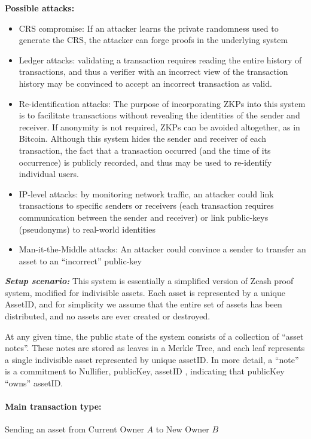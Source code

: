 		
\textbf{Possible attacks:}
\begin{itemize}
 \item CRS compromise: If an attacker learns the private randomness used to generate the CRS, the attacker can forge proofs in the underlying system
 \item Ledger attacks: validating a transaction requires reading the entire history of transactions, and thus a verifier with an incorrect view of the transaction history may be convinced to accept an incorrect transaction as valid.
 \item Re-identification attacks: The purpose of incorporating ZKPs into this system is to facilitate transactions without revealing the identities of the sender and receiver.  If anonymity is not required, ZKPs can be avoided altogether, as in Bitcoin.  Although this system hides the sender and receiver of each transaction, the fact that a transaction occurred (and the time of its occurrence) is publicly recorded, and thus may be used to re-identify individual users.
 \item IP-level attacks: by monitoring network traffic, an attacker could link transactions to specific senders or receivers (each transaction requires communication between the sender and receiver) or link public-keys (pseudonyms) to real-world identities
 \item Man-it-the-Middle attacks: An attacker could convince a sender to transfer an asset to an “incorrect” public-key
\end{itemize}


\emph{\textbf{Setup scenario:}}  This system is essentially a simplified version of Zcash proof system, modified for indivisible assets.  Each asset is represented by a unique AssetID, and for simplicity we assume that the entire set of assets has been distributed, and no assets are ever created or destroyed.

At any given time, the public state of the system consists of a collection of “asset notes”.  These notes are stored as leaves in a Merkle Tree, and each leaf represents a single indivisible asset represented by unique assetID.  In more detail, a “note” is a commitment to { Nullifier, publicKey, assetID }, indicating that publicKey “owns” assetID.


\paragraph{Main transaction type:} 
Sending an asset from Current Owner $A$ to New Owner $B$

